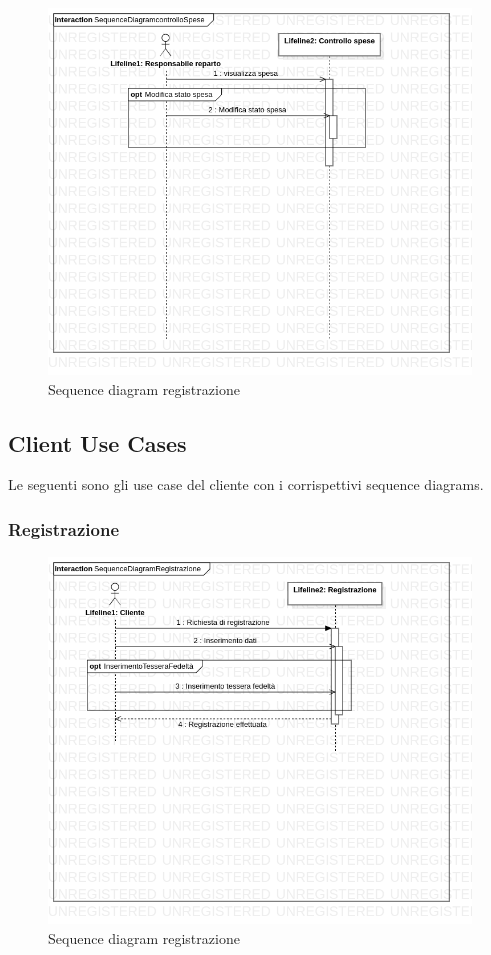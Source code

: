 \documentclass[12pt, a4paper]{article}
\numberwithin{equation}{section} %
\begin{document}
\begin{figure}[h]
\centering
\includegraphics[width=\textwidth]{Use Case Model!Controllo spese!InteractionConstrolloSpese!SequenceDiagramcontrolloSpese_11.png}
\caption{Sequence diagram registrazione}
\end{figure}

\subsection{Client Use Cases}

Le seguenti sono gli use case del cliente con i corrispettivi sequence diagrams.

\subsubsection{Registrazione}

\begin{figure}[h]
\centering
\includegraphics[width=\textwidth]{Use Case Model!Registrazione!InteractionRegistrazione!SequenceDiagramRegistrazione_1.png}
\caption{Sequence diagram registrazione}
\end{figure}
\end{document}
